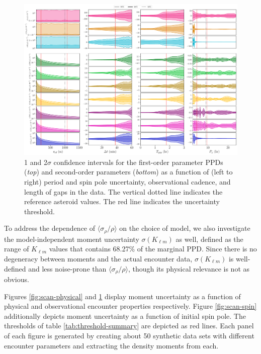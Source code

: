\documentclass[fleqn,usenatbib]{mnras}
\begin{document}
\begin{figure}
  \centering
  \includegraphics[angle=90, origin=c, width=0.98\linewidth]{figs/scan-all2.pdf}
  \caption{1 and 2$\sigma$ confidence intervals for the first-order parameter PPDs (\textit{top}) and second-order parameters (\textit{bottom}) as a function of (left to right) period and spin pole uncertainty, observational cadence, and length of gaps in the data. The vertical dotted line indicates the reference asteroid values. The red line indicates the uncertainty threshold.}
    \label{fig:scan-rho}
    \label{fig:scan-theta}
    \label{fig:scan-cadence}
    \label{fig:observation-gap}
    \label{fig:scan-observational}
\end{figure}


To address the dependence of $\langle \sigma_\rho / \rho \rangle$ on the choice of model, we also investigate the model-independent moment uncertainty $\sigma(K_{\ell m})$ as well, defined as the range of $K_{\ell m}$ values that contains 68.27\% of the marginal PPD. Since there is no degeneracy between moments and the actual encounter data, $\sigma(K_{\ell m})$ is well-defined and less noise-prone than $\langle \sigma_\rho / \rho \rangle$, though its physical relevance is not as obvious.

Figures \ref{fig:scan-physical} and \ref{fig:scan-observational} display moment uncertainty as a function of physical and observational encounter properties respectively. Figure \ref{fig:scan-spin} additionally depicts moment uncertainty as a function of initial spin pole. The thresholds of table \ref{tab:threshold-summary} are depicted as red lines. Each panel of each figure is generated by creating about 50 synthetic data sets with different encounter parameters and extracting the density moments from each.
\end{document}
